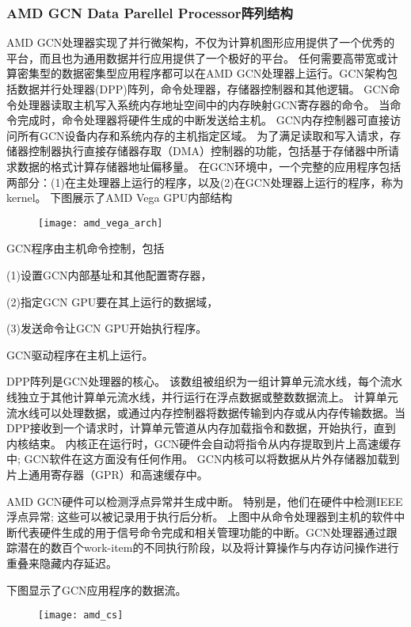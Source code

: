 \subsubsection{AMD GCN Data Parellel Processor阵列结构}
 AMD GCN处理器实现了并行微架构，不仅为计算机图形应用提供了一个优秀的平台，而且也为通用数据并行应用提供了一个极好的平台。 任何需要高带宽或计算密集型的数据密集型应用程序都可以在AMD GCN处理器上运行。GCN架构包括数据并行处理器(DPP)阵列，命令处理器，存储器控制器和其他逻辑。 GCN命令处理器读取主机写入系统内存地址空间中的内存映射GCN寄存器的命令。 当命令完成时，命令处理器将硬件生成的中断发送给主机。 GCN内存控制器可直接访问所有GCN设备内存和系统内存的主机指定区域。 为了满足读取和写入请求，存储器控制器执行直接存储器存取（DMA）控制器的功能，包括基于存储器中所请求数据的格式计算存储器地址偏移量。 在GCN环境中，一个完整的应用程序包括两部分：(1)在主处理器上运行的程序，以及(2)在GCN处理器上运行的程序，称为kernel。
下图展示了AMD Vega GPU内部结构
\begin{figure}[htbp]
	\centering
	\texttt{[image: amd\_vega\_arch]}
	\label{fig:amd_vega_arch}
\end{figure}

GCN程序由主机命令控制，包括

(1)设置GCN内部基址和其他配置寄存器，

(2)指定GCN GPU要在其上运行的数据域，

(3)发送命令让GCN GPU开始执行程序。

GCN驱动程序在主机上运行。

DPP阵列是GCN处理器的核心。 该数组被组织为一组计算单元流水线，每个流水线独立于其他计算单元流水线，并行运行在浮点数据或整数数据流上。 计算单元流水线可以处理数据，或通过内存控制器将数据传输到内存或从内存传输数据。当DPP接收到一个请求时，计算单元管道从内存加载指令和数据，开始执行，直到内核结束。 内核正在运行时，GCN硬件会自动将指令从内存提取到片上高速缓存中; GCN软件在这方面没有任何作用。 GCN内核可以将数据从片外存储器加载到片上通用寄存器（GPR）和高速缓存中。

AMD GCN硬件可以检测浮点异常并生成中断。 特别是，他们在硬件中检测IEEE浮点异常; 这些可以被记录用于执行后分析。 上图中从命令处理器到主机的软件中断代表硬件生成的用于信号命令完成和相关管理功能的中断。GCN处理器通过跟踪潜在的数百个work-item的不同执行阶段，以及将计算操作与内存访问操作进行重叠来隐藏内存延迟。

下图显示了GCN应用程序的数据流。
\begin{figure}[htbp]
	\centering
	\texttt{[image: amd\_cs]}
	\label{fig:amd_cs}
\end{figure}

